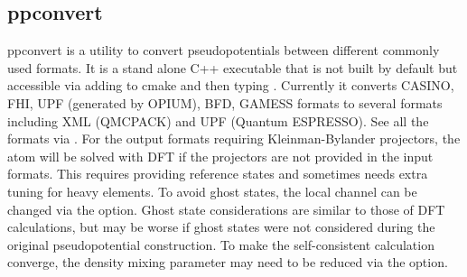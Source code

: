   \subsection{ppconvert}
    \label{sec:ppconvert}
    ppconvert is a utility to convert pseudopotentials between different commonly used formats.
    It is a stand alone C++ executable that is not built by default but accessible via adding
     to cmake and then typing .
    Currently it converts CASINO, FHI, UPF (generated by OPIUM), BFD, GAMESS formats to several formats
    including XML (QMCPACK) and UPF (Quantum ESPRESSO). See all the formats via .
    For the output formats requiring Kleinman-Bylander projectors, the atom will be solved with DFT
    if the projectors are not provided in the input formats.
    This requires providing reference states and sometimes needs extra tuning for heavy elements.
    To avoid ghost states, the local channel can be changed via the  option. Ghost state considerations are similar to those of DFT calculations, but may be worse if ghost states were not considered during the original pseudopotential construction.
    To make the self-consistent calculation converge, the density mixing parameter may need to be reduced
    via the  option.

